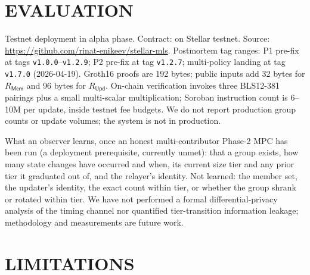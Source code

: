 \documentclass{IEEEcsmag}
\newcommand{\Rmem}{R_{\mathsf{Mem}}}
\newcommand{\Rupd}{R_{\mathsf{Upd}}}
\begin{document}
\section{EVALUATION}

Testnet deployment in alpha phase. Contract: \texttt{} on Stellar testnet. Source: \url{https://github.com/rinat-enikeev/stellar-mls}. Postmortem tag ranges: P1 pre-fix at tags \texttt{v1.0.0}--\texttt{v1.2.9}; P2 pre-fix at tag \texttt{v1.2.7}; multi-policy landing at tag \texttt{v1.7.0} (2026-04-19). Groth16 proofs are 192 bytes; public inputs add 32 bytes for $\Rmem$ and 96 bytes for $\Rupd$. On-chain verification invokes three BLS12-381 pairings plus a small multi-scalar multiplication; Soroban instruction count is 6--10M per update, inside testnet fee budgets. We do not report production group counts or update volumes; the system is not in production.

What an observer learns, once an honest multi-contributor Phase-2 MPC has been run (a deployment prerequisite, currently unmet): that a group exists, how many state changes have occurred and when, its current size tier and any prior tier it graduated out of, and the relayer's identity. Not learned: the member set, the updater's identity, the exact count within tier, or whether the group shrank or rotated within tier. We have not performed a formal differential-privacy analysis of the timing channel nor quantified tier-transition information leakage; methodology and measurements are future work.


\section{LIMITATIONS}
\end{document}
